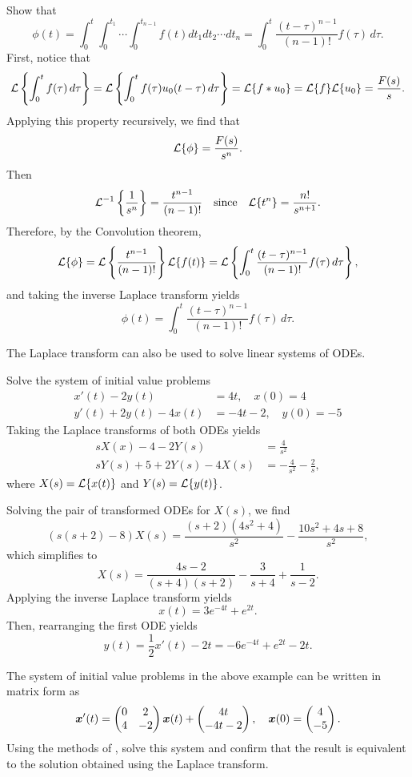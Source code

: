 \begin{eg}
	Show that
	\[
		\phi(t) = \int_0^t \int_0^{t_1} \cdots \int_0^{t_{n-1}} f(t) dt_1 dt_2 \cdots dt_n = \int_0^t \frac{(t-\tau)^{n-1}}{(n-1)!} f(\tau)\,d\tau.
	\]
	First, notice that
	\[
		\mathcal{L}\left\{\int_0^t f(\tau)\,d\tau\right\} = \mathcal{L}\left\{\int_0^t f(\tau) u_0(t-\tau) \,d\tau\right\} =  \mathcal{L}\{f*u_0\} = \mathcal{L}\{f\}\mathcal{L}\{u_0\} = \frac{F(s)}{s}.
	\]
	Applying this property recursively, we find that
	\[
		\mathcal{L}\{\phi\} = \frac{F(s)}{s^n}.
	\]
	Then
	\[
		\mathcal{L}^{-1}\left\{\frac{1}{s^n}\right\} = \frac{t^{n-1}}{(n-1)!} \quad\text{since}\quad \mathcal{L}\{t^n\} = \frac{n!}{s^{n+1}}.
	\]
	Therefore, by the Convolution theorem,
	\[
		\mathcal{L}\{\phi\} = \mathcal{L}\left\{\frac{t^{n-1}}{(n-1)!}\right\}\mathcal{L}\{f(t)\} = \mathcal{L}\left\{\int_0^t \frac{(t-\tau)^{n-1}}{(n-1)!} f(\tau)\,d\tau\right\},
	\]
	and taking the inverse Laplace transform yields
	\[
		\phi(t) = \int_0^t \frac{(t-\tau)^{n-1}}{(n-1)!} f(\tau)\,d\tau.
	\]
\end{eg}

The Laplace transform can also be used to solve linear systems of ODEs.

\begin{eg}
	Solve the system of initial value problems
	\begin{align*}
		x'(t) - 2y(t) &= 4t, \quad x(0)=4 \\
		y'(t) + 2y(t) - 4x(t) &= -4t-2, \quad y(0)=-5
	\end{align*}
	Taking the Laplace transforms of both ODEs yields
	\begin{align*}
		sX(x) - 4 - 2Y(s) &= \frac{4}{s^2} \\
		sY(s) + 5 + 2Y(s) - 4X(s) &= -\frac{4}{s^2} - \frac{2}{s},
	\end{align*}
	where $X(s) = \mathcal{L}\{x(t)\}$ and $Y(s) = \mathcal{L}\{y(t)\}$.
	
	Solving the pair of transformed ODEs for $X(s)$, we find
	\[
		(s(s+2)-8)X(s) = \frac{(s+2)(4s^2+4)}{s^2} - \frac{10s^2+4s+8}{s^2},
	\]
	which simplifies to
	\[
		X(s) = \frac{4s-2}{(s+4)(s+2)} - \frac{3}{s+4} + \frac{1}{s-2}.
	\]
	Applying the inverse Laplace transform yields
	\[
		x(t) = 3e^{-4t} + e^{2t}.
	\]
	Then, rearranging the first ODE yields
	\[
		y(t) = \frac12 x'(t) - 2t = -6e^{-4t} + e^{2t} - 2t.
	\]
\end{eg}

\begin{exercise}
	The system of initial value problems in the above example can be written in matrix form as
	\[
		\bm{x}'(t) = \begin{pmatrix}0 & 2 \\ 4 & -2\end{pmatrix}\bm{x}(t) + \begin{pmatrix}4t \\ -4t - 2\end{pmatrix}, \quad \bm{x}(0) = \begin{pmatrix}4 \\ -5\end{pmatrix}.
	\]
	Using the methods of , solve this system and confirm that the result is equivalent to the solution obtained using the Laplace transform.
\end{exercise}

